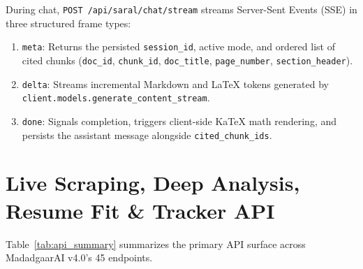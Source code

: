 \documentclass[12pt,a4paper,oneside]{report}
\begin{document}
During chat, \texttt{POST /api/saral/chat/stream} streams Server-Sent Events (SSE) in three structured frame types:
\begin{enumerate}[itemsep=2pt]
    \item \texttt{meta}: Returns the persisted \texttt{session\_id}, active mode, and ordered list of cited chunks (\texttt{doc\_id}, \texttt{chunk\_id}, \texttt{doc\_title}, \texttt{page\_number}, \texttt{section\_header}).
    \item \texttt{delta}: Streams incremental Markdown and LaTeX tokens generated by \texttt{client.models.generate\_content\_stream}.
    \item \texttt{done}: Signals completion, triggers client-side KaTeX math rendering, and persists the assistant message alongside \texttt{cited\_chunk\_ids}.
\end{enumerate}

\section{Live Scraping, Deep Analysis, Resume Fit \& Tracker API}
Table~\ref{tab:api_summary} summarizes the primary API surface across MadadgaarAI v4.0's 45 endpoints.
\end{document}
